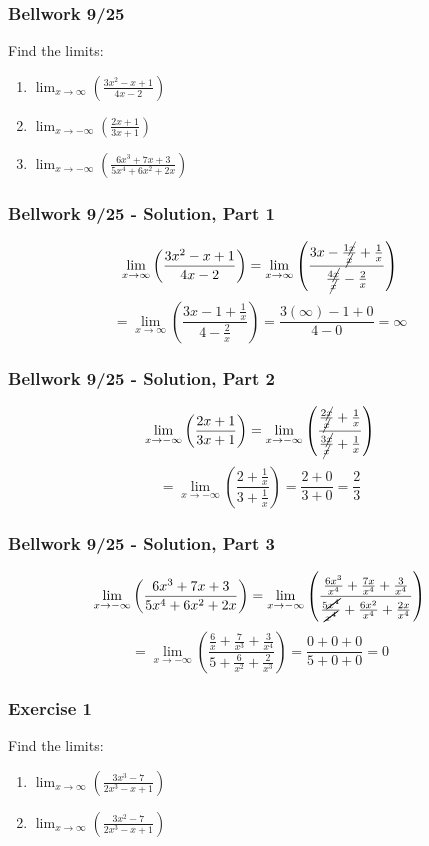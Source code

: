 \documentclass[12pt]{beamer}
\begin{document}
\begin{frame}
	\frametitle{Bellwork 9/25}

	\Large
	\initclock
	\vfill
	Find the limits:\par
	\large
	\vfill
	\vfill
	\begin{enumerate}\itemsep2ex
		\item $\displaystyle\lim_{x\to \infty}\left(\frac{3x^2-x+1}{4x-2}\right)$
		\item $\displaystyle\lim_{x\to -\infty}\left(\frac{2x+1}{3x+1}\right)$
		\item $\displaystyle\lim_{x\to -\infty}\left(\frac{6x^3+7x+3}{5x^4+6x^2+2x}\right)$
	\end{enumerate}
	\vfill
	\vfill
	\vfill
	\crono
\end{frame}
\begin{frame}
	\frametitle{Bellwork 9/25 - Solution, Part 1}

	\Large
	\[\displaystyle\lim_{x\to \infty}\left(\frac{3x^2-x+1}{4x-2}\right)=\displaystyle\lim_{x\to \infty}\left(\frac{3x-\frac{1\cancel{x}}{\cancel{x}}+\frac{1}{x}}{\frac{4\cancel{x}}{\cancel{x}}-\frac{2}{x}}\right)\]
	\[=\displaystyle\lim_{x\to \infty}\left(\frac{3x-1+\frac{1}{x}}{4-\frac{2}{x}}\right)=\frac{3(\infty)-1+0}{4-0}=\boxed{\infty}\]
\end{frame}
\begin{frame}
	\frametitle{Bellwork 9/25 - Solution, Part 2}

	\Large
	\[\displaystyle\lim_{x\to -\infty}\left(\frac{2x+1}{3x+1}\right)=\displaystyle\lim_{x\to -\infty}\left(\frac{\frac{2\cancel{x}}{\cancel{x}}+\frac{1}{x}}{\frac{3\cancel{x}}{\cancel{x}}+\frac{1}{x}}\right)\]
	\[=\displaystyle\lim_{x\to -\infty}\left(\frac{2+\frac{1}{x}}{3+\frac{1}{x}}\right)=\frac{2+0}{3+0}=\boxed{\frac{2}{3}}\]
\end{frame}
\begin{frame}
	\frametitle{Bellwork 9/25 - Solution, Part 3}

	\large
	\[\displaystyle\lim_{x\to -\infty}\left(\frac{6x^3+7x+3}{5x^4+6x^2+2x}\right)=\displaystyle\lim_{x\to -\infty}\left(\frac{\frac{6x^3}{x^4}+\frac{7x}{x^4}+\frac{3}{x^4}}{\frac{5\cancel{x^4}}{\cancel{x^4}}+\frac{6x^2}{x^4}+\frac{2x}{x^4}}\right)\]
	\[=\displaystyle\lim_{x\to -\infty}\left(\frac{\frac{6}{x}+\frac{7}{x^3}+\frac{3}{x^4}}{5+\frac{6}{x^2}+\frac{2}{x^3}}\right)=\frac{0+0+0}{5+0+0}=\boxed{0}\]
\end{frame}
\begin{frame}
	\frametitle{Exercise 1}

	\Large
	Find the limits: \\
	\vfill
	\begin{enumerate}\itemsep4ex
		\item $\displaystyle\lim_{x\to\infty}\left(\frac{3x^3-7}{2x^3-x+1}\right)$
		\item $\displaystyle\lim_{x\to\infty}\left(\frac{3x^2-7}{2x^3-x+1}\right)$
	\end{enumerate}
\end{frame}
\end{document}
